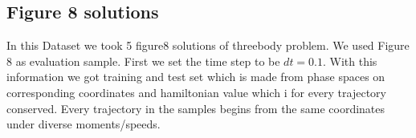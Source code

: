 \subsection{Figure 8 solutions}
In this Dataset we took 5 figure8 solutions of threebody problem. We used Figure 8 as evaluation sample. First we set the time step to be $dt = 0.1$. With this information we got training and test set which is made from phase spaces on corresponding coordinates and hamiltonian value which i for every trajectory conserved. Every trajectory in the samples begins from the same coordinates under diverse moments/speeds.  


